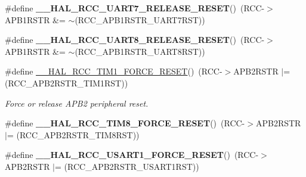 \begin{DoxyCompactItemize}
\#define {\bfseries \+\_\+\+\_\+\+H\+A\+L\+\_\+\+R\+C\+C\+\_\+\+U\+A\+R\+T7\+\_\+\+R\+E\+L\+E\+A\+S\+E\+\_\+\+R\+E\+S\+ET}()~(R\+CC-\/$>$A\+P\+B1\+R\+S\+TR \&= $\sim$(R\+C\+C\+\_\+\+A\+P\+B1\+R\+S\+T\+R\+\_\+\+U\+A\+R\+T7\+R\+ST))
\item 
\mbox{\label{group___r_c_c_ex___force___release___peripheral___reset_gabb419c2b0ac65b965ccdba4645ef9ff5}} 
\#define {\bfseries \+\_\+\+\_\+\+H\+A\+L\+\_\+\+R\+C\+C\+\_\+\+U\+A\+R\+T8\+\_\+\+R\+E\+L\+E\+A\+S\+E\+\_\+\+R\+E\+S\+ET}()~(R\+CC-\/$>$A\+P\+B1\+R\+S\+TR \&= $\sim$(R\+C\+C\+\_\+\+A\+P\+B1\+R\+S\+T\+R\+\_\+\+U\+A\+R\+T8\+R\+ST))
\item 
\mbox{\label{group___r_c_c_ex___force___release___peripheral___reset_gac423d6a52fa42423119844e4a7d68c7b}} 
\#define \mbox{\hyperlink{group___r_c_c_ex___force___release___peripheral___reset_gac423d6a52fa42423119844e4a7d68c7b}{\+\_\+\+\_\+\+H\+A\+L\+\_\+\+R\+C\+C\+\_\+\+T\+I\+M1\+\_\+\+F\+O\+R\+C\+E\+\_\+\+R\+E\+S\+ET}}()~(R\+CC-\/$>$A\+P\+B2\+R\+S\+TR $\vert$= (R\+C\+C\+\_\+\+A\+P\+B2\+R\+S\+T\+R\+\_\+\+T\+I\+M1\+R\+ST))
\begin{DoxyCompactList}\small\item\em Force or release A\+P\+B2 peripheral reset. \end{DoxyCompactList}\item 
\mbox{\label{group___r_c_c_ex___force___release___peripheral___reset_gabec722f05fbf534feb64a767b1bac1ba}} 
\#define {\bfseries \+\_\+\+\_\+\+H\+A\+L\+\_\+\+R\+C\+C\+\_\+\+T\+I\+M8\+\_\+\+F\+O\+R\+C\+E\+\_\+\+R\+E\+S\+ET}()~(R\+CC-\/$>$A\+P\+B2\+R\+S\+TR $\vert$= (R\+C\+C\+\_\+\+A\+P\+B2\+R\+S\+T\+R\+\_\+\+T\+I\+M8\+R\+ST))
\item 
\mbox{\label{group___r_c_c_ex___force___release___peripheral___reset_ga5db01cf30bf3c5c7fc0b42220f4c70ad}} 
\#define {\bfseries \+\_\+\+\_\+\+H\+A\+L\+\_\+\+R\+C\+C\+\_\+\+U\+S\+A\+R\+T1\+\_\+\+F\+O\+R\+C\+E\+\_\+\+R\+E\+S\+ET}()~(R\+CC-\/$>$A\+P\+B2\+R\+S\+TR $\vert$= (R\+C\+C\+\_\+\+A\+P\+B2\+R\+S\+T\+R\+\_\+\+U\+S\+A\+R\+T1\+R\+ST))
\item 
\mbox{\label{group___r_c_c_ex___force___release___peripheral___reset_ga36242e7bdc7abbbdc33c06e72c4b45c7}} 

\end{DoxyCompactItemize}
